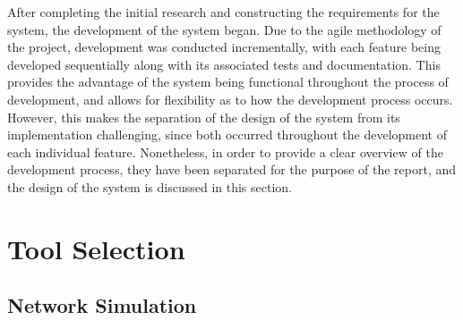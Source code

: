 











After completing the initial research and constructing the requirements for the system, the development of the system began.
Due to the agile methodology of the project, development was conducted incrementally, with each feature being developed sequentially along with its associated tests and documentation.
This provides the advantage of the system being functional throughout the process of development, and allows for flexibility as to how the development process occurs.
However, this makes the separation of the design of the system from its implementation challenging, since both occurred throughout the development of each individual feature.
Nonetheless, in order to provide a clear overview of the development process, they have been separated for the purpose of the report, and the design of the system is discussed in this section.

\section{Tool Selection}
\label{tool_selection}

\subsection{Network Simulation}


